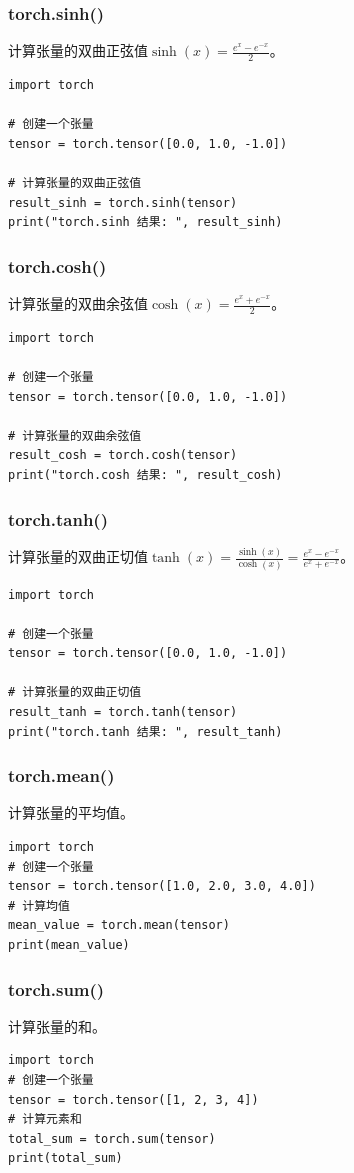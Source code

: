 \subsubsection{torch.sinh()}
计算张量的双曲正弦值$\sinh(x) = \frac{e^x - e^{-x}}{2}$。
\begin{lstlisting}[style=pythonstyle]
import torch

# 创建一个张量
tensor = torch.tensor([0.0, 1.0, -1.0])

# 计算张量的双曲正弦值
result_sinh = torch.sinh(tensor)
print("torch.sinh 结果: ", result_sinh)
\end{lstlisting}

\subsubsection{torch.cosh()}
计算张量的双曲余弦值$\cosh(x) = \frac{e^x + e^{-x}}{2}$。
\begin{lstlisting}[style=pythonstyle]
import torch

# 创建一个张量
tensor = torch.tensor([0.0, 1.0, -1.0])

# 计算张量的双曲余弦值
result_cosh = torch.cosh(tensor)
print("torch.cosh 结果: ", result_cosh)
\end{lstlisting}

\subsubsection{torch.tanh()}
计算张量的双曲正切值$\tanh(x) = \frac{\sinh(x)}{\cosh(x)} = \frac{e^x - e^{-x}}{e^x + e^{-x}}$。
\begin{lstlisting}[style=pythonstyle]
import torch

# 创建一个张量
tensor = torch.tensor([0.0, 1.0, -1.0])

# 计算张量的双曲正切值
result_tanh = torch.tanh(tensor)
print("torch.tanh 结果: ", result_tanh)
\end{lstlisting}

\subsubsection{torch.mean()}
计算张量的平均值。
\begin{lstlisting}[style=pythonstyle]
import torch
# 创建一个张量
tensor = torch.tensor([1.0, 2.0, 3.0, 4.0])
# 计算均值
mean_value = torch.mean(tensor)
print(mean_value)
\end{lstlisting}

\subsubsection{torch.sum()}     
计算张量的和。
\begin{lstlisting}[style=pythonstyle]
import torch
# 创建一个张量
tensor = torch.tensor([1, 2, 3, 4])
# 计算元素和
total_sum = torch.sum(tensor)
print(total_sum)
\end{lstlisting}

